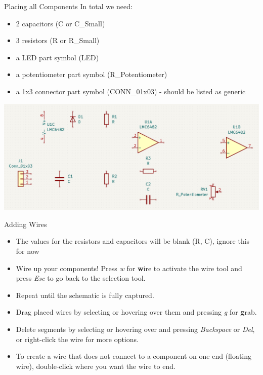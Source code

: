 \documentclass{beamer}
\begin{document}
\begin{frame}{Placing all Components}
  \vspace{-0.2cm}
  In total we need:
  \vspace{-0.2cm}
  \begin{itemize}
    \item 2 capacitors (C or C\_Small)
    \item 3 resistors (R or R\_Small)
    \item a LED part symbol (LED)
    \item a potentiometer part symbol (R\_Potentiometer)
    \item a 1x3 connector part symbol (CONN\_01x03) - should be listed as generic
  \end{itemize}
  \centering
  \includegraphics[width=\textwidth]{images/schematic-all-components.png}
\end{frame}

\begin{frame}{Adding Wires}
  \begin{itemize}
    \item The values for the resistors and capacitors will be blank (R, C), ignore this for now
    \pause
    \item Wire up your components! Press \textit{w} for \textbf{w}ire to activate the wire tool and press \textit{Esc} to go back to the selection tool.
    \item Repeat until the schematic is fully captured.
    \pause
    \item Drag placed wires by selecting or hovering over them and pressing \textit{g} for \textbf{g}rab.
    \item Delete segments by selecting or hovering over and pressing \textit{Backspace} or \textit{Del}, or right-click the wire for more options.
    \item To create a wire that does not connect to a component on one end
  (floating wire), double-click where you want the wire to end.
    
  \end{itemize}
\end{frame}
\end{document}
